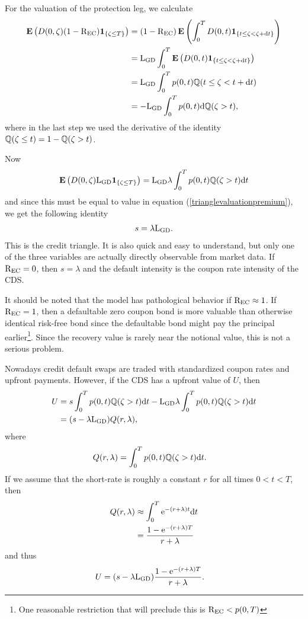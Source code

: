 For the valuation of the protection leg, we calculate
\begin{align}
\operatorname{\boldsymbol{\mathrm{E}}} \left( D(0,\zeta) (1-\mathrm{R_{EC}}) \boldsymbol{1}_{ \{ \zeta \leq T \} } \right) &= (1-\mathrm{R_{EC}}) \operatorname{\boldsymbol{\mathrm{E}}} \left( \int_0^T D(0,t) \boldsymbol{1}_{ \{ t \leq \zeta < \zeta + \mathrm{d} t \} } \right) \\
&= \mathrm{L_{GD}} \int_0^T \operatorname{\boldsymbol{\mathrm{E}}} \left( D(0,t) \boldsymbol{1}_{ \{ t \leq \zeta < \zeta + \mathrm{d} t \} } \right) \\
&= \mathrm{L_{GD}} \int_0^T p(0,t) \mathbb{Q} ( t \leq \zeta < t + \mathrm{d} t ) \\
&= - \mathrm{L_{GD}} \int_0^T p(0,t) \mathrm{d} \mathbb{Q} ( \zeta > t ),
\end{align}
where in the last step we used the derivative of the identity $\mathbb{Q} ( \zeta \leq t ) = 1 - \mathbb{Q} ( \zeta > t )$. 

Now
\begin{align}
\operatorname{\boldsymbol{\mathrm{E}}} \left( D(0,\zeta) \mathrm{L_{GD}} \boldsymbol{1}_{ \{ \zeta \leq T \} } \right) = \mathrm{L_{GD}} \lambda \int_0^T p(0,t) \mathbb{Q} ( \zeta > t ) \mathrm{d} t
\end{align}
and since this must be equal to value in equation (\ref{trianglevaluationpremium}), we get the following identity
\begin{align}
s = \lambda \mathrm{L_{GD}}.
\end{align}
This is the credit triangle. It is also quick and easy to understand, but only one of the three variables are actually directly observable from market data. If $\mathrm{R_{EC}} = 0$, then $s = \lambda$ and the default intensity is the coupon rate intensity of the CDS.

It should be noted that the model has pathological behavior if $\mathrm{R_{EC}} \approx 1$. If $\mathrm{R_{EC}} = 1$, then a defaultable zero coupon bond is more valuable than otherwise identical risk-free bond since the defaultable bond might pay the principal earlier\footnote{One reasonable restriction that will preclude this is $\mathrm{R_{EC}} < p(0,T)$}. Since the recovery value is rarely near the notional value, this is not a serious problem.

Nowadays credit default swaps are traded with standardized coupon rates and upfront payments. However, if the CDS has a upfront value of $U$, then
	\begin{align}
		U &= s \int_0^T  p(0,t) \mathbb{Q} ( \zeta > t ) \mathrm{d} t - \mathrm{L_{GD}} \lambda \int_0^T p(0,t) \mathbb{Q} ( \zeta > t ) \mathrm{d} t \\
		&= (s - \lambda \mathrm{L_{GD}}) Q(r, \lambda) ,
	\end{align}
where 
	\begin{align}
		Q(r, \lambda) &= \int_0^T  p(0,t) \mathbb{Q} ( \zeta > t ) \mathrm{d} t .
	\end{align}
If we assume that the short-rate is roughly a constant $r$ for all times $0 < t < T$, then
	\begin{align}
		Q(r, \lambda) &\approx \int_0^T  \mathrm{e}^{-(r+\lambda)t} \mathrm{d} t \\
			&= \frac{1-\mathrm{e}^{-(r+\lambda)T}}{r+\lambda}
	\end{align}
and thus
	\begin{align}
		U &= (s - \lambda \mathrm{L_{GD}}) \frac{1-\mathrm{e}^{-(r+\lambda)T}}{r+\lambda}.
	\end{align}


